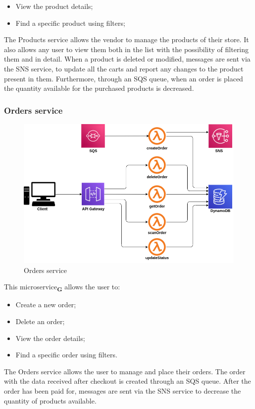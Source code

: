 \begin{itemize}
    \item View the product details;
    \item Find a specific product using filters;
\end{itemize}
The Products service allows the vendor to manage the products of their store. It also allows any user to view them both in the list with the possibility of filtering them and in detail. When a product is deleted or modified, messages are sent via the SNS service, to update all the carts and report any changes to the product present in them. Furthermore, through an SQS queue, when an order is placed the quantity available for the purchased products is decreased.
\pagebreak
\subsubsection{Orders service}
\begin{figure}[!h]
    \vspace{5px}
    \includegraphics[scale=0.5]{../../../../Images/Diagrammi/maintainerManual/orderService.png}
    \centering
    \caption{Orders service}
\end{figure}
This microservice\textsubscript{\textbf{G}} allows the user to:
\begin{itemize}
    \item Create a new order;
    \item Delete an order;
    \item View the order details;
    \item Find a specific order using filters.
\end{itemize}
The Orders service allows the user to manage and place their orders.
The order with the data received after checkout is created through an SQS queue. After the order has been paid for, messages are sent via the SNS service to decrease the quantity of products available.
\pagebreak
